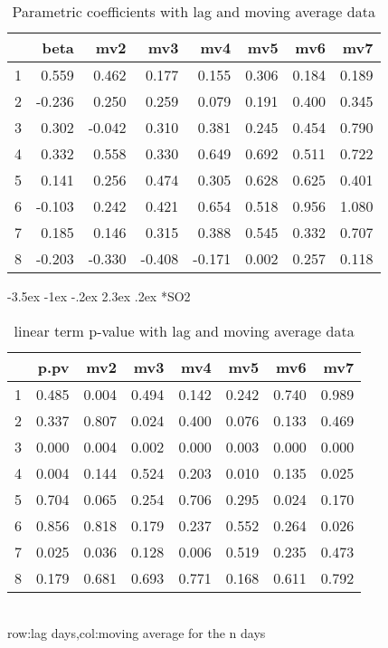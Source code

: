 \documentclass[a4paper, 12pt]{article}
\makeatletter
\def\large{\fontsize{14}{20}\selectfont}
\renewcommand\subsection{\@startsection {subsection}{1}{\z@}%
                                   {-3.5ex \@plus -1ex \@minus -.2ex}%
                                   {2.3ex \@plus.2ex}%
                                   {\centering\normalfont\large\bfseries}}
\makeatother
\begin{document}
\begin{table}[h]
\centering
\caption{Parametric coefficients with lag and moving average data}
\begin{tabular}{rrrrrrrr}
  \hline
 & beta & mv2 & mv3 & mv4 & mv5 & mv6 & mv7 \\
  \hline
1 & 0.559 & 0.462 & 0.177 & 0.155 & 0.306 & 0.184 & 0.189 \\
  2 & -0.236 & 0.250 & 0.259 & 0.079 & 0.191 & 0.400 & 0.345 \\
  3 & 0.302 & -0.042 & 0.310 & 0.381 & 0.245 & 0.454 & 0.790 \\
  4 & 0.332 & 0.558 & 0.330 & 0.649 & 0.692 & 0.511 & 0.722 \\
  5 & 0.141 & 0.256 & 0.474 & 0.305 & 0.628 & 0.625 & 0.401 \\
  6 & -0.103 & 0.242 & 0.421 & 0.654 & 0.518 & 0.956 & 1.080 \\
  7 & 0.185 & 0.146 & 0.315 & 0.388 & 0.545 & 0.332 & 0.707 \\
  8 & -0.203 & -0.330 & -0.408 & -0.171 & 0.002 & 0.257 & 0.118 \\
   \hline
\end{tabular}
\end{table}
\clearpage
\subsection*{SO2}
\begin{table}[h]
\centering
\caption{linear term p-value with lag and moving average data}
\begin{tabular}{rrrrrrrr}
  \hline
 & p.pv & mv2 & mv3 & mv4 & mv5 & mv6 & mv7 \\
  \hline
1 & 0.485 & 0.004 & 0.494 & 0.142 & 0.242 & 0.740 & 0.989 \\
  2 & 0.337 & 0.807 & 0.024 & 0.400 & 0.076 & 0.133 & 0.469 \\
  3 & 0.000 & 0.004 & 0.002 & 0.000 & 0.003 & 0.000 & 0.000 \\
  4 & 0.004 & 0.144 & 0.524 & 0.203 & 0.010 & 0.135 & 0.025 \\
  5 & 0.704 & 0.065 & 0.254 & 0.706 & 0.295 & 0.024 & 0.170 \\
  6 & 0.856 & 0.818 & 0.179 & 0.237 & 0.552 & 0.264 & 0.026 \\
  7 & 0.025 & 0.036 & 0.128 & 0.006 & 0.519 & 0.235 & 0.473 \\
  8 & 0.179 & 0.681 & 0.693 & 0.771 & 0.168 & 0.611 & 0.792 \\
   \hline
\end{tabular}
\\row:lag days,col:moving average for the n days
\end{table}
\end{document}
